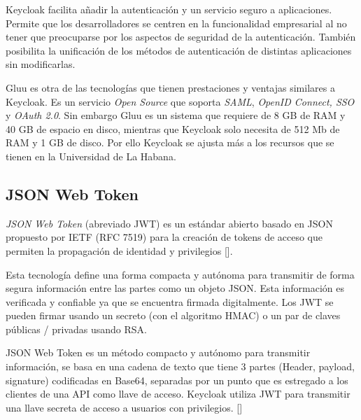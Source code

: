 	Keycloak facilita añadir la autenticación y un servicio seguro a aplicaciones. Permite que los desarrolladores se centren en la funcionalidad empresarial al no tener que preocuparse por los aspectos de seguridad de la autenticación. También posibilita la unificación de los métodos de autenticación de distintas aplicaciones sin modificarlas.
	
Gluu es otra de las tecnologías que tienen prestaciones y ventajas similares a Keycloak. Es un servicio \textit{Open Source} que soporta \textit{SAML}, \textit{OpenID Connect, SSO} y \textit{OAuth 2.0}. Sin embargo Gluu es un sistema que requiere de 8 GB de RAM y 40 GB de espacio en disco, mientras que Keycloak solo necesita de 512 Mb de RAM y 1 GB de disco. Por ello Keycloak se ajusta más a los recursos que se tienen en la Universidad de La Habana.

\subsection{JSON Web Token}
\textit{JSON Web Token }(abreviado JWT) es un estándar abierto basado en JSON propuesto por IETF (RFC 7519) para la creación de tokens de acceso que permiten la propagación de identidad y privilegios [\cite{bradley_sakimura_jones_2015}].

Esta tecnología define una forma compacta y autónoma para transmitir de forma segura información entre las partes como un objeto JSON. Esta información es verificada y confiable ya que se encuentra firmada digitalmente. Los JWT se pueden firmar usando un secreto (con el algoritmo HMAC) o un par de claves públicas / privadas usando RSA.

JSON Web Token es un método compacto y autónomo para transmitir información, se basa en una cadena de texto que tiene 3 partes (Header, payload, signature) codificadas en Base64, separadas por un punto que es estregado a los clientes de una API como llave de acceso. Keycloak utiliza JWT para transmitir una llave secreta de acceso a usuarios con privilegios. [\cite{muyon2020metodos}]

